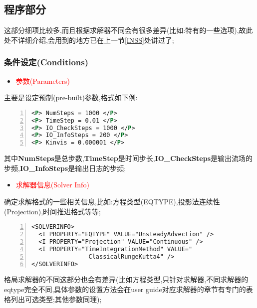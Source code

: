 \subsection{程序部分} \label{xmlprog}
这部分细项比较多,而且根据求解器不同会有很多差异(比如:特有的一些选项),故此处不详细介绍,会用到的地方已在上一节\ref{INSS}处讲过了;

\subsubsection{条件设定(Conditions)}

\begin{itemize}
\item{\textcolor{red}{参数(Parameters)}}
\end{itemize}
\par
主要是设定预制(pre-built)参数,格式如下例:
\begin{lstlisting}[frame=single,numbers=left,language=XML]
<P> NumSteps = 1000 </P>
<P> TimeStep = 0.01 </P>
<P> IO_CheckSteps = 1000 </P>
<P> IO_InfoSteps = 200 </P>
<P> Kinvis = 0.000001 </P>
\end{lstlisting}
\par
其中\textbf{NumSteps}是总步数,\textbf{TimeStep}是时间步长,\textbf{IO\_CheckSteps}是输出流场的步频,\textbf{IO\_InfoSteps}是输出日志的步频;

\begin{itemize}
	\item{\textcolor{red}{求解器信息(Solver Info)}}
\end{itemize}
\par
确定求解格式的一些相关信息,比如:方程类型(EQTYPE),投影法连续性(Projection),时间推进格式等等;
\begin{lstlisting}[frame=single,numbers=left]
<SOLVERINFO>
  <I PROPERTY="EQTYPE" VALUE="UnsteadyAdvection" />
  <I PROPERTY="Projection" VALUE="Continuous" />
  <I PROPERTY="TimeIntegrationMethod" VALUE="
  				ClassicalRungeKutta4" />
</SOLVERINFO>

\end{lstlisting}
\par
格局求解器的不同这部分也会有差异(比如方程类型,只针对求解器,不同求解器的eqtype完全不同,具体参数的设置方法会在user guide对应求解器的章节有专门的表格列出可选类型;其他参数同理);\par













